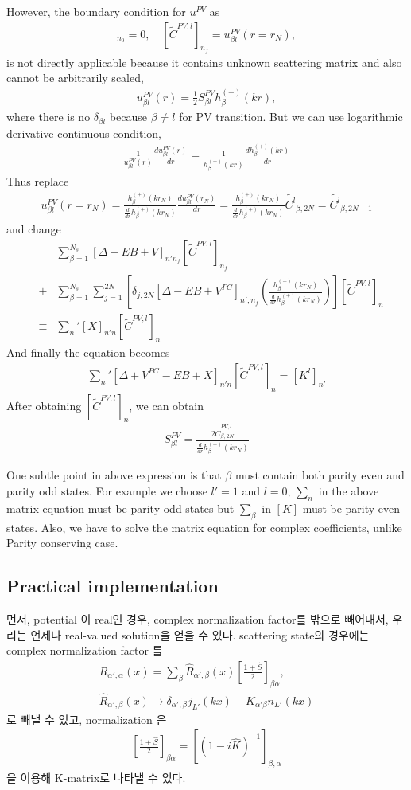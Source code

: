 \documentclass[10pt]{article}
\newcommand{\bea}{\begin{eqnarray}}
\newcommand{\eea}{\end{eqnarray}}
\newcommand{\no}{\nonumber \\}
\begin{document}
However, the boundary condition for $u^{PV}$ as   
\bea 
[\tilde{C}^{PV,l}]_{n_0}=0, \quad [\tilde{C}^{PV,l}]_{n_f}=u^{PV}_{\beta l}(r=r_N),
\eea 
is not directly applicable because it contains unknown scattering matrix
and also cannot be arbitrarily scaled,
\bea 
u^{PV}_{\beta l}(r)=\frac{1}{2}S^{PV}_{\beta l} h^{(+)}_{\beta}(kr),
\eea 
where there is no $\delta_{\beta l}$ because $\beta\neq l$ for PV transition.
But we can use logarithmic derivative continuous condition,
\bea 
\frac{1}{u^{PV}_{\beta l}(r)}\frac{d u^{PV}_{\beta l}(r)}{dr}
=\frac{1}{ h^{(+)}_{\beta}(kr)}
 \frac{d h^{(+)}_{\beta}(kr)}{dr}
\eea 
Thus replace
\bea 
u^{PV}_{\beta l}(r=r_N)=\frac{h^{(+)}_{\beta}(kr_N)  }{ \frac{d }{dr}h^{(+)}_{\beta}(kr_N)} 
                       \frac{d u^{PV}_{\beta l}(r_N)}{dr}
                       =\frac{h^{(+)}_{\beta}(kr_N)  }{ \frac{d }{dr}h^{(+)}_{\beta}(kr_N)}
                       \tilde{C^l}_{\beta,2N} =\tilde{C^l}_{\beta,2N+1} 
\eea 
and change 
\bea 
& &\sum_{\beta=1}^{N_{s}}[\Delta -E B +V]_{n'n_f}[\tilde{C}^{PV,l}]_{n_f} \no 
&+&\sum_{\beta=1}^{N_s}\sum_{j=1}^{2N} \left[ \delta_{j,2N}
   [\Delta-E B+V^{PC}]_{n',n_f} 
   \left(\frac{h^{(+)}_{\beta}(kr_N)  }{ \frac{d }{dr}h^{(+)}_{\beta}(kr_N)}\right) 
   \right] 
   [\tilde{C}^{PV,l}]_{n} \no 
&\equiv& {\sum_{n}}'[X]_{n'n}[\tilde{C}^{PV,l}]_{n}   
\eea 
And finally the equation becomes
\bea 
{\sum_n}' [\Delta+V^{PC}- E B+X]_{n'n}[\tilde{C}^{PV,l}]_{n}=[K^l]_{n'}
\eea 
After obtaining $[\tilde{C}^{PV,l}]_{n}$, we can obtain 
\bea 
S^{PV}_{\beta l}=\frac{ 2 \tilde{C}^{PV,l}_{\beta,2N} }{ \frac{d }{dr}h^{(+)}_{\beta}(kr_N)}
\eea 

One subtle point in above expression is that $\beta$ must contain 
both parity even and parity odd states. For example we choose
$l'=1$ and $l=0$, $\sum_{n}$ in the above matrix equation 
must be parity odd states but $\sum_{\beta}$ in $[K]$ must be parity even states.
Also, we have to solve the matrix equation for complex coefficients, unlike Parity conserving case.

\subsection{Practical implementation }
먼저, potential 이 real인 경우, complex normalization factor를 밖으로 빼어내서, 
우리는 언제나 real-valued solution을 얻을 수 있다. scattering state의 경우에는 complex 
normalization factor 를 
\bea
\label{spline:interp} 
R_{\alpha',\alpha}(x)=\sum_{\beta} \hat{R}_{\alpha',\beta}(x)[\frac{1+\hat{S}}{2}]_{\beta\alpha},
\no 
\hat{R}_{\alpha',\beta}(x)\to \delta_{\alpha',\beta} j_{L'}(kx)
                             -\hat{K}_{\alpha'\beta} n_{L'}(kx) 
\eea 
로 빼낼 수 있고, normalization 은 
\bea 
\label{spline:SK}
[\frac{1+\hat{S}}{2}]_{\beta\alpha}=[(1-i\hat{K})^{-1}]_{\beta,\alpha}
\eea 
을 이용해  K-matrix로 나타낼 수 있다. 
\end{document}
